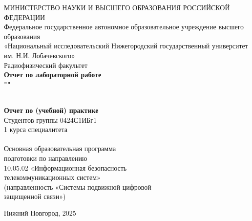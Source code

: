 
%

\begin{center}
	МИНИСТЕРСТВО НАУКИ И ВЫСШЕГО ОБРАЗОВАНИЯ РОССИЙСКОЙ
	ФЕДЕРАЦИИ\\
	
	\hfill \break
	Федеральное государственное автономное образовательное учреждение высшего образования \\«Национальный исследовательский Нижегородский государственный университет им. Н.И. Лобачевского» \\
	
	\hfill \break
	Радиофизический факультет\\
	\vspace{2.5cm}
	\large{\textbf{ Отчет по лабораторной работе \\ "\mytitle"}}\\
	\hfill \break
	\\
\end{center}

\vspace{0cm}

\begin{flushright}
	{\bf Отчет по (учебной) практике}\\
	Студентов группы 0424С1ИБг1\\
	1 курса специалитета\\
	\myauthor \\
	\hfill \break
	Основная образовательная программа\\
	подготовки по направлению\\
	10.05.02 «Информационная безопасность\\ 
	телекоммуникационных систем»\\
	(направленность «Системы подвижной цифровой\\
	защищенной связи»)
\end{flushright}

\vfill
\begin{center} Нижний Новгород, 2025 \end{center}
\thispagestyle{empty}
\newpage
